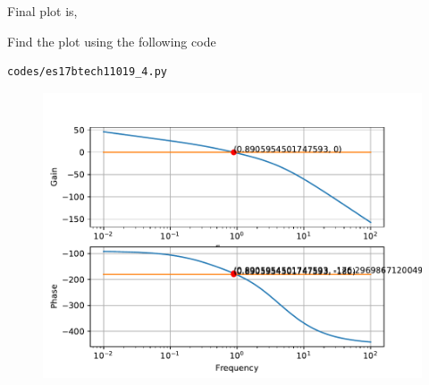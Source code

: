Final plot is,

Find the plot using the following code
\begin{lstlisting}
codes/es17btech11019_4.py
\end{lstlisting}

\begin{figure}[!ht]
  \centering
  \includegraphics[width=\columnwidth]{./figs/es17btech11019_5}
  \caption{}
  \label{fig:es17btech11019_4}
\end{figure}


